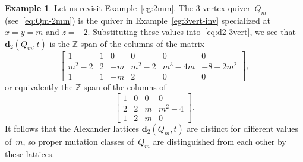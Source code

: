 \documentclass[11pt, letterpaper]{amsart}
\newcommand{\cS}[1]{{\noindent\textsf{\color{purple}$\blacksquare$~#1~$\blacksquare$}}}
\newcommand{\hide}[1]{}
\theoremstyle{definition}
\newtheorem{example}[theorem]{Example}
\numberwithin{equation}{section}
\def\ZZ{{\mathbb Z}}
\def\dd{{\mathbf{d}}}
\begin{document}
\pagebreak[3]

\begin{example}
\label{eg:2mm-continued}
Let us revisit Example~\ref{eg:2mm}.
The 3-vertex quiver~$Q_m$ (see~\eqref{eq:Qm-2mm}) is the quiver in Example~\ref{eg:3vert-inv} specialized at $x=y=m$ and $z=-2$. 
Substituting these values into~\eqref{eq:d2-3vert}, we see that $\dd_2(Q_m,t)$
is the $\ZZ$-span of the columns of the matrix
\begin{equation*}
\begin{bmatrix}
1		& 1		& 0		& 0		& 0		& 0	 \\
m^2\!-\!2	& 2		& -m		& m^2-2	& m^3-4m	& -8+2m^2 \\
1		& 1		& -m		& 2		& 0		& 0
\end{bmatrix} \!,
\end{equation*}
or equivalently the $\ZZ$-span of the columns of 
\begin{equation*}
\begin{bmatrix}
1		& 0		& 0		& 0		 \\
2		& 2		& m		& m^2-4 \\
1		& 2		& m		& 0		
\end{bmatrix} \!. 
\end{equation*}
It follows that the Alexander lattices $\dd_2(Q_m,t)$ are distinct for different values of~$m$,
so proper mutation classes of~$Q_m$ are distinguished from each other by these lattices. 
\end{example}

\hide{
To see this, substitute $t=-1$ into the parametrized companion: 
\begin{equation*}
P_Q(-1)
= - U_Q - U_Q^T
=\begin{bmatrix} -2 & m & -2 \\ m & -2 & m \\ -2 &  m & -2 \end{bmatrix}; 
\end{equation*}
then observe that $d_2(P_Q(-1))=(m^2-4)\ZZ$. 
\cS{todo: new}
This can be seen by either taking the SNF of $P_{C_m}(-1)$, or by computing $d_2$ of $P_{C_m}(t)$.
Specifically, if $m$ is odd (resp. even) then the SNF of $P_{C_m}(-1)$ has $\alpha_1 = 1$ (resp. $2$), $\alpha_2 = m^2-4$ (resp. $\frac{1}{2}(m^2-4)$), and $\alpha_3=0$ (regardless of $m$):
\begin{equation*}
\begin{bmatrix}
1 & 0 & 0 \\
0 & m^2-4 & 0 \\
0 & 0 & 0
\end{bmatrix}
(m \text{ odd}), 
\quad
\begin{bmatrix}
2 & 0 & 0 \\
0 & \frac{1}{2}m^2-2 & 0 \\
0 & 0 & 0
\end{bmatrix}
(m \text{ even}). 
\end{equation*}
An (admittably more tedious) computation reveals that $d_2$ is a lattice spanned by $1 - t^2, m^2-4$, and either $2(1+t)$ or $1+t$, depending on if $m$ is even or not.
} %
\end{document}
